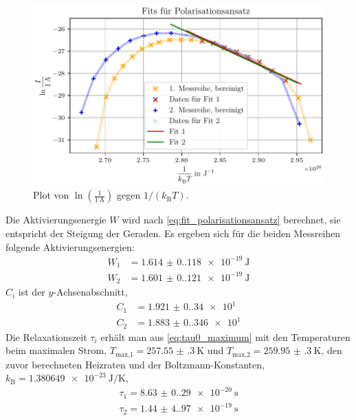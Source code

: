 \begin{figure}[H]
    \centering
    \includegraphics[width=\textwidth]{plots/G_polarisationsansatz.pdf}
    \caption{Plot von $\ln\left(\frac{1}{\qty{1}{\ampere}}\right)$ gegen $1/(k_\text{B}T)$.}
    \label{fig:Polarisationsansatz}
\end{figure}

Die Aktivierungsenergie $W$ wird nach \autoref{eq:fit_polarisationsansatz} berechnet, sie entspricht der Steigung der Geraden.
Es ergeben sich für die beiden Messreihen folgende Aktivierungsenergien:
\begin{align*}
W_1 &= \qty{1.614(0.118)e-19}{\joule}\\
W_2 &= \qty{1.601(0.121)e-19}{\joule}
\end{align*}
$C_i$ ist der $y$-Achsenabschnitt,
\begin{align*}
C_1 &= \num{1.921(0.340)e1}\\
C_2 &= \num{1.883(0.346)e1}
\end{align*}
Die Relaxationszeit $\tau_i$ erhält man aus \autoref{eq:tau0_maximum} mit den Temperaturen beim maximalen Strom,
$T_{\text{max,} 1} = \qty{257.55(30)}{\kelvin}$ und $T_{\text{max,} 2} = \qty{259.95(30)}{\kelvin}$, den zuvor berechneten Heizraten und der Boltzmann-Konstanten,
$k_\text{B} = \qty{1.380649e-23}{\joule\per\kelvin}$,
\begin{align*}
\tau_1 = \qty{8.63(0.29)e-20}{\second}\\
\tau_2 = \qty{1.44(4.97)e-19}{\second}
\end{align*}

